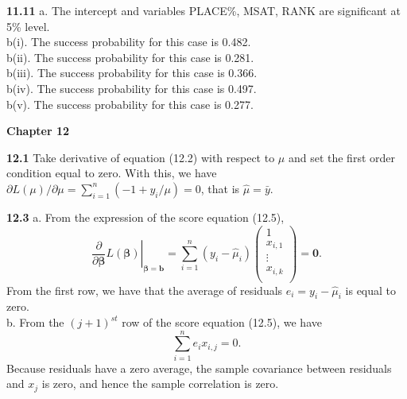\textbf{11.11} a. The intercept and variables PLACE\%, MSAT, RANK
are significant at 5\% level.\\
b(i). The success probability for this case is 0.482. \\
b(ii). The success probability for this case is 0.281. \\
b(iii). The success probability for this case is 0.366. \\
b(iv). The success probability for this case is 0.497. \\
b(v). The success probability for this case is 0.277. \\


\begin{center}\large \textbf{Chapter 12}\end{center}


\textbf{12.1} Take derivative of equation (12.2) with respect to
$\mu$ and set the first order condition equal to zero. With this,
we have $\partial L(\mu)/\partial \mu=\sum_{i=1}^{n}(-1+y_i/\mu)=0$,
that is $\hat\mu=\bar y$.

\textbf{12.3} a. From the expression of the score equation (12.5),
\begin{equation*}
\left. \frac{\partial }{\partial \boldsymbol \beta} L(\boldsymbol
\beta )\right\vert _{\mathbf{\beta =b}}= \sum_{i=1}^{n}\left(
y_i-\widehat{\mu }_i\right) \left(
                                                   \begin{array}{c}
                                                     1 \\
                                                     x_{i,1} \\
                                                     \vdots \\
                                                      x_{i,k} \\
                                                   \end{array}
                                                 \right) =
                                                 \mathbf{0}.
\end{equation*}
From the first row, we have that the average of residuals $e_i = y_i
- \widehat{\mu}_i$ is equal to zero.\\
b. From the $(j+1)^{st}$ row of the score equation (12.5), we have
\begin{equation*}
\sum_{i=1}^{n} e_i x_{i,j}= 0.
\end{equation*}
Because residuals have a zero average, the sample covariance between
residuals and $x_j$ is zero, and hence the sample correlation is
zero.



